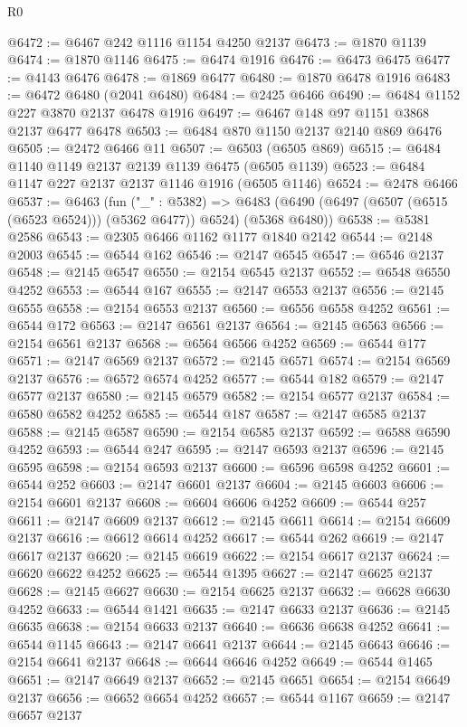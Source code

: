 \begin{lexlean}{R0}
\begin{coremodule}
@6472 := @6467 @242 @1116 @1154 @4250 @2137
@6473 := @1870 @1139
@6474 := @1870 @1146
@6475 := @6474 @1916
@6476 := @6473 @6475
@6477 := @4143 @6476
@6478 := @1869 @6477
@6480 := @1870 @6478 @1916
@6483 := @6472 @6480 (@2041 @6480)
@6484 := @2425 @6466
@6490 := @6484 @1152 @227 @3870 @2137 @6478 @1916
@6497 := @6467 @148 @97 @1151 @3868 @2137 @6477 @6478
@6503 := @6484 @870 @1150 @2137 @2140 @869 @6476
@6505 := @2472 @6466 @11
@6507 := @6503 (@6505 @869)
@6515 := @6484 @1140 @1149 @2137 @2139 @1139 @6475 (@6505 @1139)
@6523 := @6484 @1147 @227 @2137 @2137 @1146 @1916 (@6505 @1146)
@6524 := @2478 @6466
@6537 := @6463
    (fun ("_" : @5382) =>
    @6483 (@6490 (@6497 (@6507 (@6515 (@6523 @6524))) (@5362 @6477)) @6524) (@5368 @6480))
@6538 := @5381 @2586
@6543 := @2305 @6466 @1162 @1177 @1840 @2142
@6544 := @2148 @2003
@6545 := @6544 @162
@6546 := @2147 @6545
@6547 := @6546 @2137
@6548 := @2145 @6547
@6550 := @2154 @6545 @2137
@6552 := @6548 @6550 @4252
@6553 := @6544 @167
@6555 := @2147 @6553 @2137
@6556 := @2145 @6555
@6558 := @2154 @6553 @2137
@6560 := @6556 @6558 @4252
@6561 := @6544 @172
@6563 := @2147 @6561 @2137
@6564 := @2145 @6563
@6566 := @2154 @6561 @2137
@6568 := @6564 @6566 @4252
@6569 := @6544 @177
@6571 := @2147 @6569 @2137
@6572 := @2145 @6571
@6574 := @2154 @6569 @2137
@6576 := @6572 @6574 @4252
@6577 := @6544 @182
@6579 := @2147 @6577 @2137
@6580 := @2145 @6579
@6582 := @2154 @6577 @2137
@6584 := @6580 @6582 @4252
@6585 := @6544 @187
@6587 := @2147 @6585 @2137
@6588 := @2145 @6587
@6590 := @2154 @6585 @2137
@6592 := @6588 @6590 @4252
@6593 := @6544 @247
@6595 := @2147 @6593 @2137
@6596 := @2145 @6595
@6598 := @2154 @6593 @2137
@6600 := @6596 @6598 @4252
@6601 := @6544 @252
@6603 := @2147 @6601 @2137
@6604 := @2145 @6603
@6606 := @2154 @6601 @2137
@6608 := @6604 @6606 @4252
@6609 := @6544 @257
@6611 := @2147 @6609 @2137
@6612 := @2145 @6611
@6614 := @2154 @6609 @2137
@6616 := @6612 @6614 @4252
@6617 := @6544 @262
@6619 := @2147 @6617 @2137
@6620 := @2145 @6619
@6622 := @2154 @6617 @2137
@6624 := @6620 @6622 @4252
@6625 := @6544 @1395
@6627 := @2147 @6625 @2137
@6628 := @2145 @6627
@6630 := @2154 @6625 @2137
@6632 := @6628 @6630 @4252
@6633 := @6544 @1421
@6635 := @2147 @6633 @2137
@6636 := @2145 @6635
@6638 := @2154 @6633 @2137
@6640 := @6636 @6638 @4252
@6641 := @6544 @1145
@6643 := @2147 @6641 @2137
@6644 := @2145 @6643
@6646 := @2154 @6641 @2137
@6648 := @6644 @6646 @4252
@6649 := @6544 @1465
@6651 := @2147 @6649 @2137
@6652 := @2145 @6651
@6654 := @2154 @6649 @2137
@6656 := @6652 @6654 @4252
@6657 := @6544 @1167
@6659 := @2147 @6657 @2137

\end{coremodule}
\end{lexlean}
